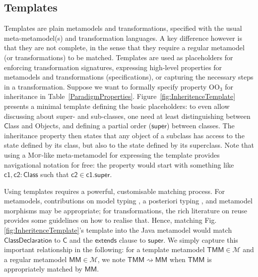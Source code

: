\subsection{Templates}
\label{sec:Templates}

Templates are plain metamodels and transformations, specified with the usual
meta-metamodel(s) and transformation languages.
A key difference however is that they are not complete, in the sense that they
require a regular metamodel (or transformations) to be matched.
Templates are used as placeholders for enforcing transformation signatures,
expressing high-level properties for metamodels and transformations
(specifications), or capturing the necessary steps in a transformation.
Suppose we want to formally specify property $\mbox{OO}_3$ for inheritance in 
Table~\ref{ParadigmProperties}. 
Figure~\ref{fig:InheritenceTemplate} presents a 
minimal template defining the basic placeholders: to even allow discussing 
about super- and sub-classes, one need at least distinguishing between 
$\mathsf{C}$lass and Objects, and defining a partial order ($\mathsf{super}$) 
between classes. The inheritance property then states that any object of a 
subclass has access to the state defined by its class, but also to the state 
defined by its superclass. Note that using a \textsc{Mof}-like meta-metamodel 
for expressing the template provides navigational notation for free: the 
property would start with something like $\mathsf{c1, c2 : Class}$ such that 
$\mathsf{c2} \in \mathsf{c1.super}$.

Using templates requires a powerful, customisable matching process.
For metamodels, contributions on model typing \cite{J:Degueule-etAl:2017}, a
posteriori typing \cite{J:deLara-Guerra:2017}, and metamodel morphisms
\cite{Salay-Mylopoulos-Esterbrook:2008,Duran-Zschaler-Troya:2012} may be
appropriate; for transformations, the rich literature on reuse
\cite{J:Kusel-etAl:2015} provides some guidelines on how to realise that.
Hence, matching Fig. \ref{fig:InheritenceTemplate}'s template into the Java
metamodel \cite{B:Java:2019} would match $\mathsf{ClassDeclaration}$ to
$\mathsf{C}$ and the $\mathsf{extends}$ clause to $\mathsf{super}$.
We simply capture this important relationship in the following: for a template
metamodel $\mathsf{TMM}\in\mathcal{M}$ and a regular metamodel
$\mathsf{MM}\in\mathcal{M}$, we note $\mathsf{TMM} \rightsquigarrow \mathsf{MM}$
when $\mathsf{TMM}$ is appropriately matched by $\mathsf{MM}$.

